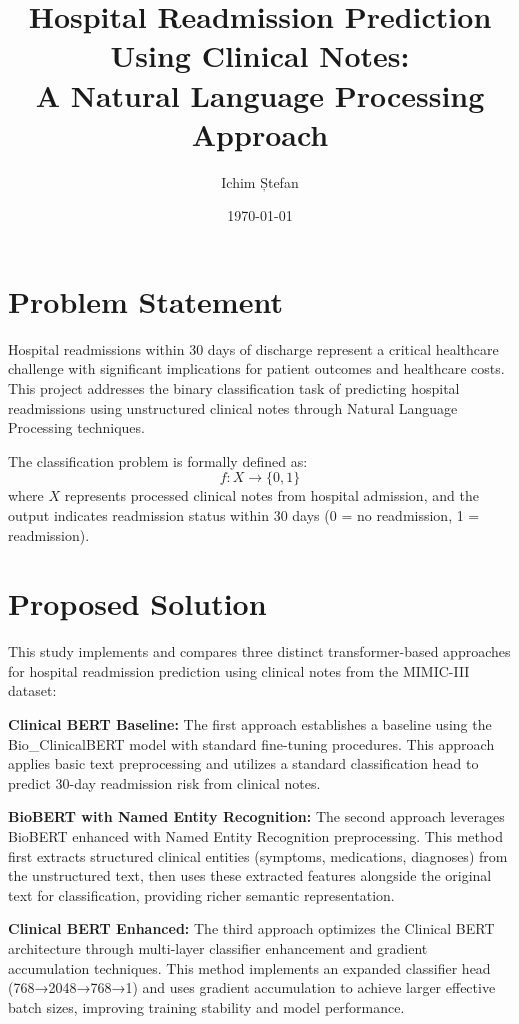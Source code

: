 \documentclass[11pt,a4paper]{article}
\title{Hospital Readmission Prediction Using Clinical Notes:\\A Natural Language Processing Approach}
\author{Ichim Ștefan}
\date{\today}
\begin{document}
\maketitle

\section{Problem Statement}

Hospital readmissions within 30 days of discharge represent a critical healthcare challenge with significant implications for patient outcomes and healthcare costs. This project addresses the binary classification task of predicting hospital readmissions using unstructured clinical notes through Natural Language Processing techniques.

The classification problem is formally defined as:
\begin{equation}
f: X \rightarrow \{0, 1\}
\end{equation}
where $X$ represents processed clinical notes from hospital admission, and the output indicates readmission status within 30 days (0 = no readmission, 1 = readmission).

\section{Proposed Solution}

This study implements and compares three distinct transformer-based approaches for hospital readmission prediction using clinical notes from the MIMIC-III dataset:

\textbf{Clinical BERT Baseline:} The first approach establishes a baseline using the Bio\_ClinicalBERT model with standard fine-tuning procedures. This approach applies basic text preprocessing and utilizes a standard classification head to predict 30-day readmission risk from clinical notes.

\textbf{BioBERT with Named Entity Recognition:} The second approach leverages BioBERT enhanced with Named Entity Recognition preprocessing. This method first extracts structured clinical entities (symptoms, medications, diagnoses) from the unstructured text, then uses these extracted features alongside the original text for classification, providing richer semantic representation.

\textbf{Clinical BERT Enhanced:} The third approach optimizes the Clinical BERT architecture through multi-layer classifier enhancement and gradient accumulation techniques. This method implements an expanded classifier head (768→2048→768→1) and uses gradient accumulation to achieve larger effective batch sizes, improving training stability and model performance.
\end{document}

